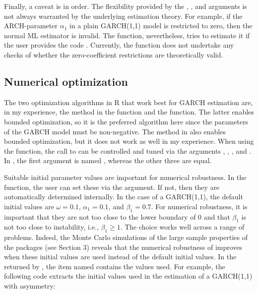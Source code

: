 Finally, a caveat is in order. The flexibility provided by the , , and  arguments is not always warranted by the underlying estimation theory. For example, if the ARCH-parameter $\alpha_1$ in a plain GARCH(1,1) model is restricted to zero, then the normal ML estimator is invalid. The  function, nevertheless, tries to estimate it if the user provides the code . Currently, the function  does not undertake any checks of whether the zero-coefficient restrictions are theoretically valid.

\subsection{Numerical optimization}

The two optimization algorithms in  R that work best for GARCH estimation are, in my experience, the  method in the  function and the  function. The latter enables bounded optimization, so it is the preferred algorithm here since the parameters of the GARCH model must be non-negative. The  method in  also enables bounded optimization, but it does not work as well in my experience. When using the  function, the call to  can be controlled and tuned via the arguments , , , and . In , the first argument is named , whereas the other three are equal.

Suitable initial parameter values are important for numerical robustness. In the   function, the user can set these via the  argument. If not, then they are automatically determined internally. In the case of a GARCH(1,1), the default initial values are $\omega=0.1$, $\alpha_1=0.1$, and $\beta_1=0.7$. For numerical robustness, it is important that they are not too close to the lower boundary of 0 and that $\beta_1$ is not too close to instability, i.e., $\beta_1 \geq 1$. The choice  works well across a range of problems. Indeed, the Monte Carlo simulations of the large sample properties of the packages (see Section 3) reveals that the numerical robustness of  improves when these initial values are used instead of the default initial values. In the  returned by , the item named  contains the values used. For example, the following code extracts the initial values used in the estimation of a GARCH(1,1) with asymmetry:
%
%

